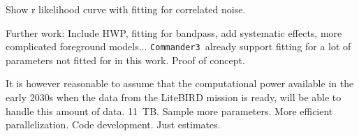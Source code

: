 \documentclass[twocolumn]{aa}
\def\commanderthree{\texttt{Commander3}}
\begin{document}
Show r likelihood curve with fitting for correlated noise. 

Further work: Include HWP, fitting for bandpass, add systematic effects, more complicated foreground models... \commanderthree\ already support fitting for a lot of parameters not fitted for in this work. Proof of concept. 

It is however reasonable to assume that the computational power available in the early 2030s when the data from the LiteBIRD mission is ready, will be able to handle this amount of data. 11~TB. Sample more parameters. More efficient parallelization. Code development. Just estimates. 








\end{document}
